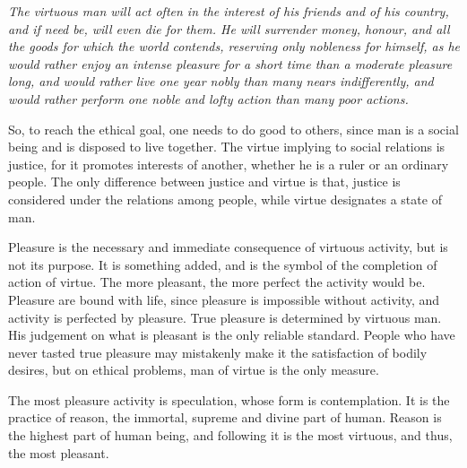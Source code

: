 \documentclass[11pt]{article}
\begin{document}
\textit{The virtuous man will act often in the interest of his friends and of his country, and if need be, will even die for them. He will surrender money, honour, and all the goods for which the world contends, reserving only nobleness for himself, as he would rather enjoy an intense pleasure for a short time than a moderate pleasure long, and would rather live one year nobly than many nears indifferently, and would rather perform one noble and lofty action than many poor actions.}


So, to reach the ethical goal, one needs to do good to others, since man is a social being and is disposed to live together. 
The virtue implying to social relations is justice, for it promotes interests of another, whether he is a ruler or an ordinary people. 
The only difference between justice and virtue is that, justice is considered under the relations among people, while virtue designates a state of man.

\newline

Pleasure is the necessary and immediate consequence of virtuous activity, but is not its purpose. 
It is something added, and is the symbol of the completion of action of virtue. 
The more pleasant, the more perfect the activity would be. 
Pleasure are bound with life, since pleasure is impossible without activity, and activity is perfected by pleasure. 
True pleasure is determined by virtuous man. 
His judgement on what is pleasant is the only reliable standard. 
People who have never tasted true pleasure may mistakenly make it the satisfaction of bodily desires, but on ethical problems, man of virtue is the only measure.

\newline

The most pleasure activity is speculation, whose form is contemplation. 
It is the practice of reason, the immortal, supreme and divine part of human. 
Reason is the highest part of human being, and following it is the most virtuous, and thus, the most pleasant. 

\newline
\end{document}
